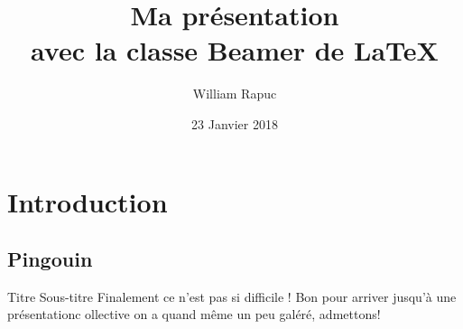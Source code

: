 \documentclass[usenames,dvipsnames, 12pt]{beamer}
\title{Ma présentation \\avec la classe Beamer de \LaTeX}
\author{William Rapuc}
\institute{EDYTEM}
\date{23 Janvier 2018}
\begin{document}
\section{Introduction}
\subsection{Pingouin}

 \begin{frame}
 \titlepage
 \end{frame}
 \begin{frame}{Titre }{Sous-titre}
  Finalement ce n'est pas si difficile ! Bon pour arriver jusqu'à une présentationc ollective on a quand même un peu galéré, admettons!
 
 	\end{frame}
\end{document}
